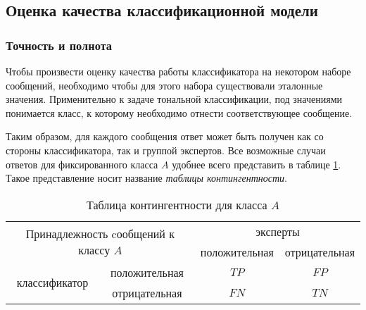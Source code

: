     \subsection{Оценка качества классификационной модели}

        \subsubsection{Точность и полнота}
    Чтобы произвести оценку качества работы классификатора на некотором наборе
    сообщений, необходимо чтобы для этого набора существовали эталонные
    значения. Применительно к задаче тональной классификации, под значениями
    понимается класс, к которому необходимо отнести соответствующее сообщение.

    Таким образом, для каждого сообщения ответ может быть получен как со стороны
    классификатора, так и группой экспертов. Все возможные случаи ответов
    для фиксированного класса $A$ удобнее всего представить в таблице
    \ref{table:contingent}. Такое представление носит название
    {\it таблицы контингентности}.

    \begin{table}[H]
        \centering
        \caption{Таблица контингентности для класса $A$}
        \label{table:contingent}
        \begin{tabular}{|c|c|c|c|}
            \hline
            \multicolumn{2}{|c|}{\multirow{2}{*}{Принадлежность cообщений к классу $A$}} &     \multicolumn{2}{c|}{эксперты}                     \\ \cline{3-4}
            \multicolumn{2}{|c|}{}                                              &   положительная             & отрицательная                           \\ \hline
            \multirow{2}{*}{классификатор}          & положительная             & {\cellcolor[HTML]{9AFF99} $TP$} & {\cellcolor[HTML]{FFCCC9} $FP$}     \\ \cline{2-4}
                                                    & отрицательная             & {\cellcolor[HTML]{FFCCC9} $FN$} & {\cellcolor[HTML]{9AFF99} $TN$}     \\ \hline
        \end{tabular}
     \end{table}

